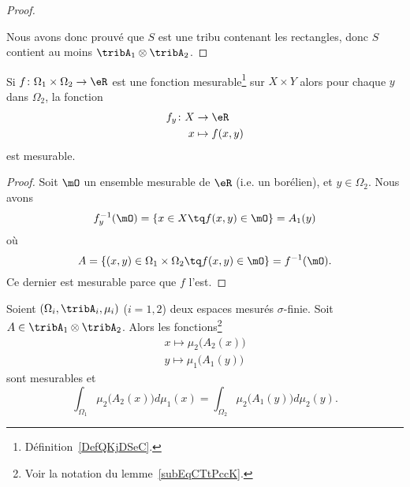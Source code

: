 \begin{proof}
\begin{subproof}
    \end{subproof}
    Nous avons donc prouvé que \( S\) est une tribu contenant les rectangles, donc \( S\) contient au moins \( \tribA_1\otimes \tribA_2\).
\end{proof}

\begin{corollary}
    Si \( f\colon \Omega_1\times \Omega_2\to \eR\) est une fonction mesurable\footnote{Définition~\ref{DefQKjDSeC}.} sur \( X\times Y\) alors pour chaque \( y\) dans \( \Omega_2\), la fonction
    \begin{equation}
        \begin{aligned}
            f_y\colon X&\to \eR \\
            x&\mapsto f(x,y)
        \end{aligned}
    \end{equation}
    est mesurable.
\end{corollary}

\begin{proof}
    Soit \( \mO\) un ensemble mesurable de \( \eR\) (i.e. un borélien), et \( y\in \Omega_2\). Nous avons
    \begin{equation}
        f_y^{-1}(\mO)=\{ x\in X\tq f(x,y)\in \mO \}=A_1(y)
    \end{equation}
    où
    \begin{equation}
        A=\{ (x,y)\in \Omega_1\times \Omega_2\tq f(x,y)\in \mO \}=f^{-1}(\mO).
    \end{equation}
    Ce dernier est mesurable parce que \( f\) l'est.
\end{proof}

\begin{theorem}    \label{ThoCCIsLhO}
    Soient \( (\Omega_i,\tribA_i,\mu_i)\) (\( i=1,2\)) deux espaces mesurés \( \sigma\)-finie. Soit \( A\in\tribA_1\otimes \tribA_2\). Alors les fonctions\footnote{Voir la notation du lemme~\ref{subEqCTtPccK}.}
    \begin{subequations}
        \begin{align}
            x\mapsto\mu_2\big( A_2(x) \big)\\
            y\mapsto\mu_1\big( A_1(y) \big)
        \end{align}
    \end{subequations}
    sont mesurables et
    \begin{equation}    \label{EqRKXwsQJ}
        \int_{\Omega_1}\mu_2\big( A_2(x) \big)d\mu_1(x)=\int_{\Omega_2}\mu_2\big( A_1(y) \big)d\mu_2(y).
    \end{equation}
\end{theorem}

